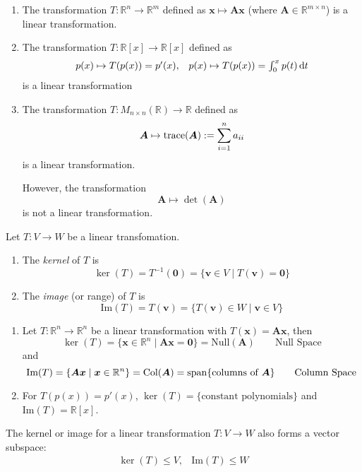 \begin{example}
\begin{enumerate}
\item
The transformation $T:\mathbb{R}^n\to\mathbb{R}^m$ defined as $\bm x\mapsto\bm{Ax}$ (where $\bm A\in\mathbb{R}^{m\times n}$) is a linear transformation.

\item
The transformation $T:\mathbb{R}[x]\to\mathbb{R}[x]$ defined as
\[
\begin{array}{ll}
p(x)\mapsto T(p(x))=p'(x),
&
p(x)\mapsto T(p(x))=\int_0^xp(t)\,\mathrm{d} t
\end{array}
\]
is a linear transformation

\item
The transformation $T: M_{n\times n}(\mathbb{R})\to\mathbb{R}$ defined as
\[
\bm A\mapsto\operatorname{trace}(\bm A):=\sum_{i=1}^na_{ii}
\]
is a linear transformation.

However, the transformation
\[
\bm A\mapsto\det(\bm A)
\]
is not a linear transformation.
\end{enumerate}
\end{example}

\begin{definition}
Let $T:V\to W$ be a linear transfomation. 
\begin{enumerate}
\item
The \emph{kernel} of $T$ is
\[
\ker(T)=T^{-1}(\bm0)=\{\bm v\in V\mid T(\bm v)=\bm0\}
\]
\item
The \emph{image} (or range) of $T$ is
\[
\text{Im}(T)=T(\bm v)=\{T(\bm v)\in W\mid\bm v\in V\}
\]
\end{enumerate}
\end{definition}

\begin{example}
\begin{enumerate}
\item
Let $T:\mathbb{R}^n\to\mathbb{R}^n$ be a linear transformation with $T(\bm x)=\bm{Ax}$, then
\[
\ker(T)=\{\bm x\in\mathbb{R}^n\mid\bm{Ax}=\bm0\}
=
\text{Null}(\bm A)\qquad\mbox{Null Space}
\]
and
\[
\text{Im}(T)=\{\bm{Ax}\mid\bm x\in\mathbb{R}^n\}
=\text{Col}(\bm A)
=\operatorname{span}\{\text{columns of $\bm A$}\}
\qquad\mbox{Column Space}
\]
\item
For $T(p(x))=p'(x)$, $\ker(T)=\{\text{constant polynomials}\}$ and $\text{Im}(T)=\mathbb{R}[x]$.
\end{enumerate}
\end{example}

\begin{proposition}
The kernel or image for a linear transformation $T:V\to W$ also forms a vector subspace:
\[
\begin{array}{ll}
\ker(T)\le V,
&
\text{Im}(T)\le W
\end{array}
\]
\end{proposition}

